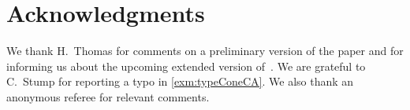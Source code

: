 \documentclass{amsart}
\theoremstyle{definition}
\begin{document}

\section*{Acknowledgments}

We thank H.~Thomas for comments on a preliminary version of the paper and for informing us about the upcoming extended version of~\cite{BazierMatteChapelierLaguetDouvilleMousavandThomasYildirim}.
We are grateful to C.~Stump for reporting a typo in \cref{exm:typeConeCA}.
We also thank an anonymous referee for relevant comments.




\label{sec:biblio}
\end{document}
